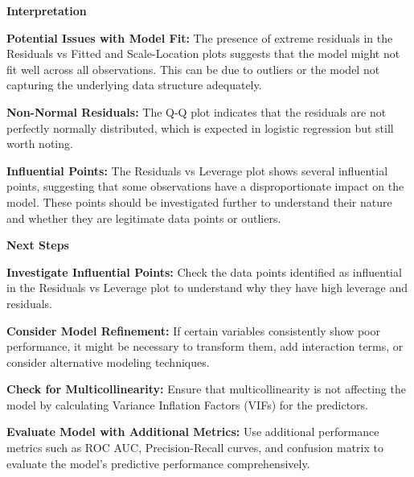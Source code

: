\documentclass[
]{article}
\begin{document}
\textbf{Interpretation}

\textbf{Potential Issues with Model Fit:} The presence of extreme
residuals in the Residuals vs Fitted and Scale-Location plots suggests
that the model might not fit well across all observations. This can be
due to outliers or the model not capturing the underlying data structure
adequately.

\textbf{Non-Normal Residuals:} The Q-Q plot indicates that the residuals
are not perfectly normally distributed, which is expected in logistic
regression but still worth noting.

\textbf{Influential Points:} The Residuals vs Leverage plot shows
several influential points, suggesting that some observations have a
disproportionate impact on the model. These points should be
investigated further to understand their nature and whether they are
legitimate data points or outliers.

\textbf{Next Steps}

\textbf{Investigate Influential Points:} Check the data points
identified as influential in the Residuals vs Leverage plot to
understand why they have high leverage and residuals.

\textbf{Consider Model Refinement:} If certain variables consistently
show poor performance, it might be necessary to transform them, add
interaction terms, or consider alternative modeling techniques.

\textbf{Check for Multicollinearity:} Ensure that multicollinearity is
not affecting the model by calculating Variance Inflation Factors (VIFs)
for the predictors.

\textbf{Evaluate Model with Additional Metrics:} Use additional
performance metrics such as ROC AUC, Precision-Recall curves, and
confusion matrix to evaluate the model's predictive performance
comprehensively.
\end{document}
